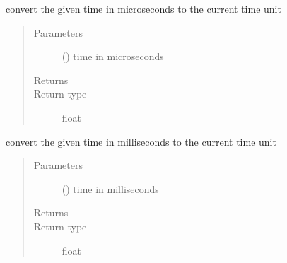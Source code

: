 \documentclass[letterpaper,10pt,english]{sphinxmanual}
\begin{document}
\begin{fulllineitems}
\begin{fulllineitems}
\begin{quote}
\begin{description}
\end{description}\end{quote}

\end{fulllineitems}


\begin{fulllineitems}
\label{\detokenize{Reference:salabim.Environment.microseconds}}
convert the given time in microseconds to the current time unit
\begin{quote}\begin{description}
\item[{Parameters}] \leavevmode
{} () \textendash{} time in microseconds

\item[{Returns}] \leavevmode
{}

\item[{Return type}] \leavevmode
float

\end{description}\end{quote}

\end{fulllineitems}


\begin{fulllineitems}
\label{\detokenize{Reference:salabim.Environment.milliseconds}}
convert the given time in milliseconds to the current time unit
\begin{quote}\begin{description}
\item[{Parameters}] \leavevmode
{} () \textendash{} time in milliseconds

\item[{Returns}] \leavevmode
{}

\item[{Return type}] \leavevmode
float

\end{description}\end{quote}


\end{fulllineitems}
\end{fulllineitems}
\end{document}
